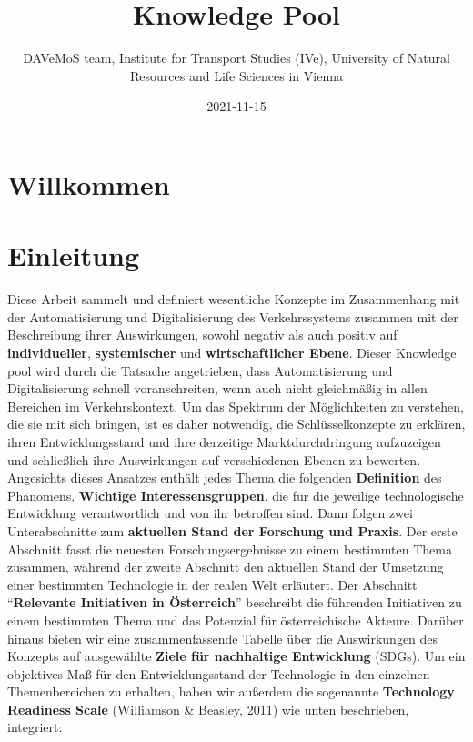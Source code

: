 \documentclass[
]{book}
\title{Knowledge Pool}
\author{DAVeMoS team, Institute for Transport Studies (IVe), University of Natural Resources and Life Sciences in Vienna}
\date{2021-11-15}
\begin{document}
\maketitle

{
\setcounter{tocdepth}{1}
\tableofcontents
}
\hypertarget{willkommen}{%
\chapter{Willkommen}\label{willkommen}}

\hypertarget{intro}{%
\chapter{Einleitung}\label{intro}}

Diese Arbeit sammelt und definiert wesentliche Konzepte im Zusammenhang mit der Automatisierung und Digitalisierung des Verkehrssystems zusammen mit der Beschreibung ihrer Auswirkungen, sowohl negativ als auch positiv auf \textbf{individueller}, \textbf{systemischer} und \textbf{wirtschaftlicher Ebene}. Dieser Knowledge pool wird durch die Tatsache angetrieben, dass Automatisierung und Digitalisierung schnell voranschreiten, wenn auch nicht gleichmäßig in allen Bereichen im Verkehrskontext. Um das Spektrum der Möglichkeiten zu verstehen, die sie mit sich bringen, ist es daher notwendig, die Schlüsselkonzepte zu erklären, ihren Entwicklungsstand und ihre derzeitige Marktdurchdringung aufzuzeigen und schließlich ihre Auswirkungen auf verschiedenen Ebenen zu bewerten. Angesichts dieses Ansatzes enthält jedes Thema die folgenden \textbf{Definition} des Phänomens,
\textbf{Wichtige Interessensgruppen}, die für die jeweilige technologische Entwicklung verantwortlich und von ihr betroffen sind. Dann folgen zwei Unterabschnitte zum \textbf{aktuellen Stand der Forschung und Praxis}. Der erste Abschnitt fasst die neuesten Forschungsergebnisse zu einem bestimmten Thema zusammen, während der zweite Abschnitt den aktuellen Stand der Umsetzung einer bestimmten Technologie in der realen Welt erläutert. Der Abschnitt ``\textbf{Relevante Initiativen in Österreich}'' beschreibt die führenden Initiativen zu einem bestimmten Thema und das Potenzial für österreichische Akteure. Darüber hinaus bieten wir eine zusammenfassende Tabelle über die Auswirkungen des Konzepts auf ausgewählte \textbf{Ziele für nachhaltige Entwicklung} (SDGs). Um ein objektives Maß für den Entwicklungsstand der Technologie in den einzelnen Themenbereichen zu erhalten, haben wir außerdem die sogenannte \textbf{Technology Readiness Scale} (Williamson \& Beasley, 2011) wie unten beschrieben, integriert:
\end{document}
